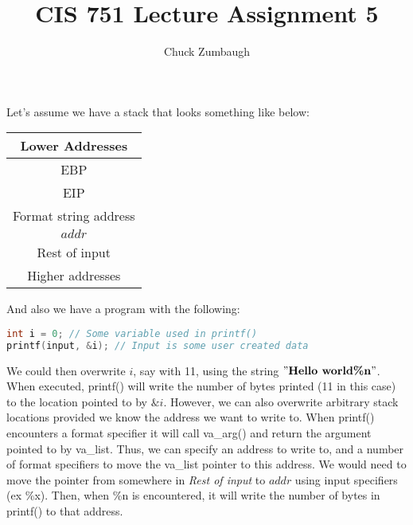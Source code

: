 \documentclass[12pt]{article}
\author{Chuck Zumbaugh}
\title{CIS 751 Lecture Assignment 5}
\begin{document}
\maketitle

Let's assume we have a stack that looks something like below:
\bigbreak
\begin{tabular}{|c|}
\hline
Lower Addresses \\
\hline
EBP \\
\hline
EIP \\
\hline
Format string address \\
\hline
$addr$ \\
\hline
Rest of input \\
\hline
Higher addresses \\
\hline
\end{tabular}
\bigbreak

And also we have a program with the following:

\begin{lstlisting}[language=c]
int i = 0; // Some variable used in printf()
printf(input, &i); // Input is some user created data
\end{lstlisting}

We could then overwrite $i$, say with 11, using the string $"\textbf{Hello world\%n}"$. When executed, printf() will write the number of bytes printed (11 in this case) to the location pointed to by $\&i$. However, we can also overwrite arbitrary stack locations provided we know the address we want to write to. When printf() encounters a format specifier it will call va\_arg() and return the argument pointed to by va\_list. Thus, we can specify an address to write to, and a number of format specifiers to move the va\_list pointer to this address. We would need to move the pointer from somewhere in \textit{Rest of input} to $addr$ using input specifiers (ex \%x). Then, when \%n is encountered, it will write the number of bytes in printf() to that address.
\end{document}

